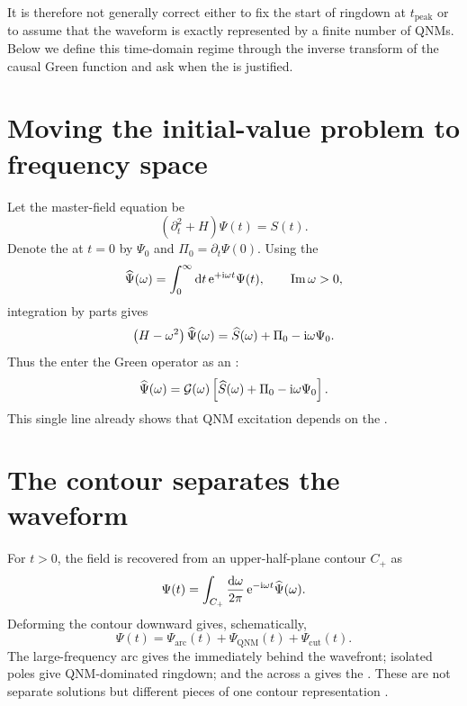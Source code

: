 It is therefore not generally correct either to fix the start of ringdown at $t_{\mathrm{peak}}$ or to assume that the waveform is exactly represented by a finite number of QNMs. Below we define this time-domain regime through the inverse transform of the causal Green function and ask when the  is justified.

\section{Moving the initial-value problem to frequency space}

Let the master-field equation be
\begin{equation}
\left(\partial_t^2+H\right)\Psi(t)
=
S(t).
\label{eq:time-response-wave}
\end{equation}
Denote the  at $t=0$ by $\Psi_0$ and $\Pi_0=\partial_t\Psi(0)$. Using the 
\begin{equation}
\widehat\Psi(\omega)
=
\int_0^\infty \mathrm{d} t\,
\mathrm{e}^{+\mathrm{i}\omega t}\Psi(t),
\qquad
\operatorname{Im}\omega>0,
\label{eq:one-sided-transform}
\end{equation}
integration by parts gives
\begin{equation}
\left(H-\omega^2\right)\widehat\Psi(\omega)
=
\widehat S(\omega)
+\Pi_0
-\mathrm{i}\omega\Psi_0.
\label{eq:initial-data-source}
\end{equation}
Thus the  enter the Green operator as an :
\begin{equation}
\widehat\Psi(\omega)
=
\mathcal{G}(\omega)
\left[
\widehat S(\omega)+\Pi_0-\mathrm{i}\omega\Psi_0
\right].
\label{eq:initial-response-resolvent}
\end{equation}
This single line already shows that QNM excitation depends on the .

\section{The contour separates the waveform}

For $t>0$, the field is recovered from an upper-half-plane contour $C_+$ as
\begin{equation}
\Psi(t)
=
\int_{C_+}
\frac{\mathrm{d}\omega}{2\pi}\,
\mathrm{e}^{-\mathrm{i}\omega t}
\widehat\Psi(\omega).
\label{eq:time-inverse-contour}
\end{equation}
Deforming the contour downward gives, schematically,
\begin{equation}
\Psi(t)
=
\Psi_{\mathrm{arc}}(t)
+\Psi_{\mathrm{QNM}}(t)
+\Psi_{\mathrm{cut}}(t).
\label{eq:prompt-ringdown-tail}
\end{equation}
The large-frequency arc gives the  immediately behind the wavefront; isolated poles give QNM-dominated ringdown; and the  across a  gives the . These are not separate solutions but different pieces of one contour representation \cite{Leaver:1986gd}.

